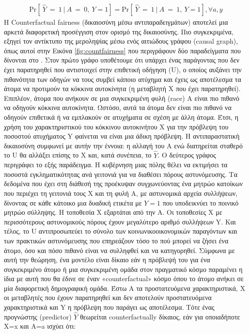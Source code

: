 \begin{align}
\mathrm{Pr}\left[\ \hat{Y}\ =\ 1\ |\ A\ =\ 0,\ Y=1\right]= \mathrm{Pr} \left[\ \hat{Y}\ =\ 1\ |\ A\ =\ 1,\ Y=1 \right],∀a ,y
\end{align}
Η Counterfactual fairness \cite{kusnerCounterfactualFairness2018} (δικαιοσύνη μέσω αντιπαραδειγμάτων) αποτελεί μια αρκετά διαφορετική προσέγγιση στον ορισμό της δικαιοσύνης. Πιο συγκεκριμένα, εξηγεί τον αντίκτυπο της μεροληψίας μέσω ενός αιτιώδους γράφου (causal graph), όπως αυτοί στην Εικόνα \ref{fig:countfairness} που περιγράφουν δύο παραδείγματα που δίνονται στο \cite{kusnerCounterfactualFairness2018}. Στον πρώτο γράφο υποθέτουμε ότι υπάρχει ένας παράγοντας που δεν έχει παρατηρηθεί που αντιστοιχεί στην επιθετική οδήγηση (U), ο οποίος αυξάνει την πιθανότητα των οδηγών να τους συμβεί κάποιο ατύχημα και έχεις ως αποτέλεσμα τα άτομα να προτιμούν τα κόκκινα αυτοκίνητα (η μεταβλητή X που έχει παρατηρηθεί). Επιπλέον, άτομα που ανήκουν σε μια συγκεκριμένη φυλή (race) Α είναι πιο πιθανό να οδηγούν κόκκινα αυτοκίνητα.  Ωστόσο, αυτά τα άτομα δεν είναι πιο πιθανό να οδηγούν επιθετικά ή να εμπλακούν σε ατυχήματα σε σχέση με άλλη άτομα. Έτσι, η χρήση του χαρακτηριστικού του κόκκινου αυτοκινήτου X για την πρόβλεψη του ποσοστού ατυχήματος Y φαίνεται να είναι μια άδικη πρόβλεψη. Η αντιπαραστατική δικαιοσύνη συμφωνεί με αυτήν την έννοια: η αλλαγή του A ενώ διατηρείται σταθερό το U θα αλλάξει επίσης το X και, κατά συνέπεια, το $ \hat{Y} $. Ο δεύτερος γράφος περιγράφει το εξής παράδειγμα. Η κυβέρνηση μιας πόλης θέλει να εκτιμήσει τα ποσοστά εγκληματικότητας ανά γειτονιά για να διαθέσει πόρους αστυνόμευσης. Τα δεδομένα που έχει στη διάθεσή της προέκυψαν συγχωνεύοντας ένα μητρώο κατοίκων που περιέχει τη γειτονιά τους Χ και τη φυλή Α, με αστυνομικά αρχεία συλλήψεων, δίνοντας σε κάθε κάτοικο μια δυαδική ετικέτα με $  Y = 1  $ που υποδεικνύει το ποινικό μητρώο σύλληψης. Η τοποθεσία X εξαρτάται από την Α. Οι τοποθεσίες X με περισσότερους αστυνομικούς πόρους έχουν μεγαλύτερο αριθμό συλλήψεων Y. Και τέλος, το U αντιπροσωπεύει το σύνολο των κοινωνικοοικονομικών παραγόντων και των πρακτικών αστυνόμευσης που επηρεάζουν τόσο το πού μπορεί να ζήσει ένα άτομο, όσο και πόσο πιθανό είναι να συλληφθεί και να κατηγορηθεί. Σύμφωνα με αυτή την θεώρηση, ένα μοντέλο είναι δίκαιο εάν η πρόβλεψή του για ένα συγκεκριμένο άτομο ή μια συγκεκριμένη ομάδα στον πραγματικό κόσμο παραμένει η ίδια με αυτή που θα έδινε σε έναν «counterfactual» κόσμο όπου το άτομο ανήκει σε μία διαφορετική δημογραφική ομάδα. Έστω A τα προστατευόμενα χαρακτηριστικά, Χ οι μεταβλητές που έχουν παρατηρηθεί και δεν αποτελούν προστατευόμενα χαρακτηριστικά και Y η πρόβλεψη που παράγει ως αποτέλεσμα. Τότε ένας προγνώστης (predictor) $ \hat{Y} $ θεωρείται counterfactually δίκαιος, εάν για οποιαδήποτε Χ=x και A=a ισχύει ότι:  
